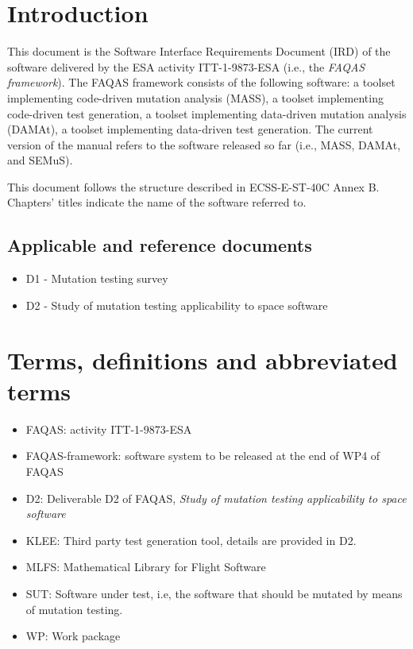 
\chapter{Introduction}

This document is the Software Interface Requirements Document (IRD) of the software delivered by the ESA activity ITT-1-9873-ESA (i.e., the \emph{FAQAS framework}).
The FAQAS framework consists of the following software: a toolset  implementing code-driven mutation analysis (MASS), a toolset implementing code-driven test generation, a toolset implementing data-driven mutation analysis (DAMAt), a toolset implementing data-driven test generation. The current version of the manual refers to the software released so far (i.e., MASS, DAMAt, and SEMuS).

This document follows the structure described in ECSS-E-ST-40C Annex B. Chapters' titles indicate the name of the software referred to.

\section{Applicable and reference documents}

\begin{itemize}
\item{D1 - Mutation testing survey}
\item{D2 - Study of mutation testing applicability to space software}
\end{itemize}

\chapter{Terms, definitions and abbreviated terms}

\begin{itemize}
\item{FAQAS}: activity ITT-1-9873-ESA
\item{FAQAS-framework}: software system to be released at the end of WP4 of FAQAS
\item{D2}: Deliverable D2 of FAQAS, \emph{Study of mutation testing applicability to space software}
\item{KLEE}: Third party test generation tool, details are provided in D2.
\item{MLFS}: Mathematical Library for Flight Software
\item{SUT}: Software under test, i.e, the software that should be mutated by means of mutation testing.
\item{WP}: Work package

\end{itemize}

\clearpage
